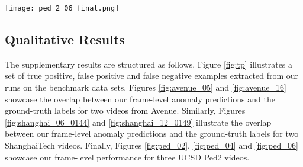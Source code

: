 \documentclass[final]{cvpr}
\begin{document}
\begin{figure*}[!t]
\begin{center}
\texttt{[image: ped\_2\_06\_final.png]}
\end{center}
\vspace{-0.4cm}
\caption{Frame-level scores and anomaly localization examples for test video 06 from UCSD Ped2. Best viewed in color.}
\label{fig:ped_06}
\vspace{-0.1cm}
\end{figure*}



\subsection{Qualitative Results}

The supplementary results are structured as follows. Figure \ref{fig:tp} illustrates a set of true positive, false positive and false negative examples extracted from our runs on the benchmark data sets. Figures \ref{fig:avenue_05} and \ref{fig:avenue_16} showcase the overlap between our frame-level anomaly predictions and the ground-truth labels for two videos from Avenue. Similarly, Figures \ref{fig:shanghai_06_0144} and \ref{fig:shanghai_12_0149} illustrate the overlap between our frame-level anomaly predictions and the ground-truth labels for two ShanghaiTech videos. Finally, Figures \ref{fig:ped_02}, \ref{fig:ped_04} and \ref{fig:ped_06} showcase our frame-level performance for three UCSD Ped2 videos.
\end{document}
